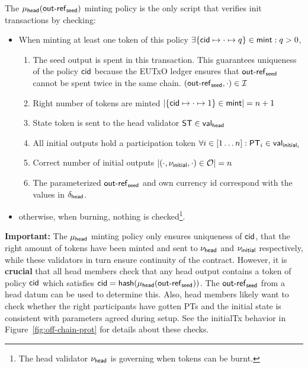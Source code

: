 \noindent The $\mu_\mathsf{head}(\mathsf{out\textsf{-}{}ref}_{\mathsf{seed}})$ minting policy is the only
script that verifies init transactions by checking:
\begin{itemize}
	\item When minting at least one token of this policy
	      $\exists \{\mathsf{cid} \mapsto \cdot \mapsto q\} \in \mathsf{mint} : q > 0$,
	      \begin{enumerate}
		      \item The seed output is spent in this transaction. This guarantees uniqueness of the policy $\mathsf{cid}$ because the EUTxO ledger ensures that $\mathsf{out\textsf{-}{}ref}_{\mathsf{seed}}$ cannot be spent twice in the same chain.
		            $(\mathsf{out\textsf{-}{}ref}_{\mathsf{seed}}, \cdot) \in \mathcal{I}$
		      \item Right number of tokens are minted
		            $|\{\mathsf{cid} \mapsto \cdot \mapsto 1\} \in \mathsf{mint}| = n + 1$
		      \item State token is sent to the head validator $\mathsf{ST} \in \mathsf{val}_{\mathsf{head}}$
		      \item All initial outputs hold a participation token $\forall i \in [1 \dots n] : \mathsf{PT}_{i} \in \mathsf{val}_{\mathsf{initial}_{i}}$
		      \item Correct number of initial outputs $|(\cdot, \nu_{\mathsf{initial}}, \cdot) \in \mathcal{O}| = n$
		      \item The parameterized $\mathsf{out\textsf{-}{}ref}_{\mathsf{seed}}$ and own currency id
		            correspond with the values in $\delta_{\mathsf{head}}$.
	      \end{enumerate}
	\item otherwise, when burning, nothing is checked\footnote{The head validator
		      $\nu_\mathsf{head}$ is governing when tokens can be burnt.}.
\end{itemize}

\noindent \textbf{Important:} The $\mu_\mathsf{head}$ minting policy only ensures
uniqueness of $\mathsf{cid}$, that the right amount of tokens have been minted and sent
to $\nu_\mathsf{head}$ and $\nu_{\mathsf{initial}}$ respectively, while these validators in turn
ensure continuity of the contract. However, it is \textbf{crucial} that all head
members check that any head output contains a token of policy $\mathsf{cid}$ which
satisfies $\mathsf{cid} = \mathsf{hash}(\mu_\mathsf{head}(\mathsf{out\textsf{-}{}ref}_{\mathsf{seed}}))$. The
$\mathsf{out\textsf{-}{}ref}_{\mathsf{seed}}$ from a head datum can be used to determine this.
Also, head members likely want to check
whether the right participants have gotten PTs and the initial state is
consistent with parameters agreed during setup. See the initialTx behavior in
Figure~\ref{fig:off-chain-prot} for details about these checks.\\

